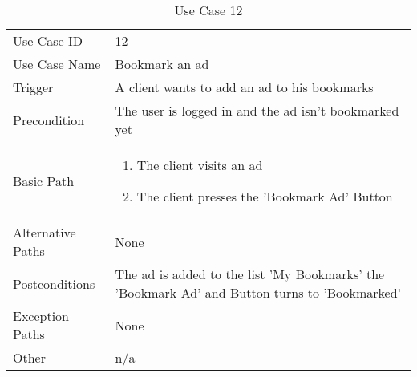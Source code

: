 \begin{table}[H]
\centering
\label{table-use-case-12}
\begin{tabular}{|p{3cm}|p{10cm}}
Use Case ID       & 12                                                           
\\
Use Case Name     & Bookmark an ad                                                          
\\
Trigger           & A client wants to add an ad to his bookmarks                                           
\\
Precondition      & The user is logged in and the ad isn't bookmarked yet                                                 
\\
Basic Path        & \begin{enumerate}
\item The client visits an ad
\item The client presses the 'Bookmark Ad' Button
\end{enumerate} 
     \\
Alternative Paths & None                          \\
Postconditions    & The ad is added to the list 'My Bookmarks' the 'Bookmark Ad'
and Button turns to 'Bookmarked'
\\
Exception Paths   & None                          \\
Other             & n/a                                                                                                                                                                                                        
\end{tabular}
\caption{Use Case 12}
\end{table}


